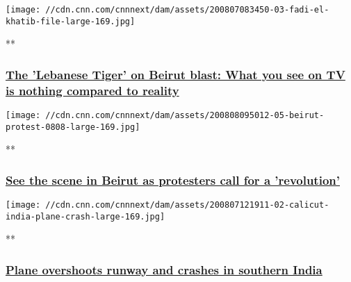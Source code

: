 \texttt{[image: //cdn.cnn.com/cnnnext/dam/assets/200807083450-03-fadi-el-khatib-file-large-169.jpg]}

**

\hypertarget{the-lebanese-tiger-on-beirut-blast-what-you-see-on-tv-is-nothing-compared-to-reality-1}{%
\subsubsection{\texorpdfstring{\href{/videos/sports/2020/08/07/fadi-el-khatib-basketball-hero-lebanon-beirut-explosion-charity-spt-intl-lon-orig.cnn/video/playlists/around-the-world/}{The
'Lebanese Tiger' on Beirut blast: What you see on TV is nothing compared
to
reality}}{The 'Lebanese Tiger' on Beirut blast: What you see on TV is nothing compared to reality}}\label{the-lebanese-tiger-on-beirut-blast-what-you-see-on-tv-is-nothing-compared-to-reality-1}}

\href{/videos/world/2020/08/08/protesters-in-beirut-wedeman-vpx.cnn/video/playlists/around-the-world/}{}

\texttt{[image: //cdn.cnn.com/cnnnext/dam/assets/200808095012-05-beirut-protest-0808-large-169.jpg]}

**

\hypertarget{see-the-scene-in-beirut-as-protesters-call-for-a-revolution-}{%
\subsubsection{\texorpdfstring{\href{/videos/world/2020/08/08/protesters-in-beirut-wedeman-vpx.cnn/video/playlists/around-the-world/}{See
the scene in Beirut as protesters call for a 'revolution'
}}{See the scene in Beirut as protesters call for a 'revolution' }}\label{see-the-scene-in-beirut-as-protesters-call-for-a-revolution-}}

\href{/videos/world/2020/08/07/plane-crash-kozhikode-international-airport-air-india-express-vedika-sud-intl-vpx.cnn/video/playlists/around-the-world/}{}

\texttt{[image: //cdn.cnn.com/cnnnext/dam/assets/200807121911-02-calicut-india-plane-crash-large-169.jpg]}

**

\hypertarget{plane-overshoots-runway-and-crashes-in-southern-india}{%
\subsubsection{\texorpdfstring{\href{/videos/world/2020/08/07/plane-crash-kozhikode-international-airport-air-india-express-vedika-sud-intl-vpx.cnn/video/playlists/around-the-world/}{Plane
overshoots runway and crashes in southern
India}}{Plane overshoots runway and crashes in southern India}}\label{plane-overshoots-runway-and-crashes-in-southern-india}}


